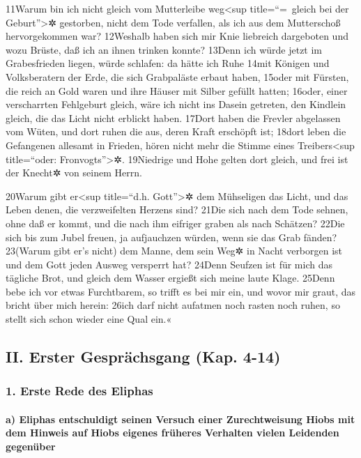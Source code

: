 11Warum bin ich nicht gleich vom Mutterleibe weg\textless sup
title=``=~gleich bei der Geburt''\textgreater✲ gestorben, nicht dem Tode
verfallen, als ich aus dem Mutterschoß hervorgekommen war? 12Weshalb
haben sich mir Knie liebreich dargeboten und wozu Brüste, daß ich an
ihnen trinken konnte? 13Denn ich würde jetzt im Grabesfrieden liegen,
würde schlafen: da hätte ich Ruhe 14mit Königen und Volksberatern der
Erde, die sich Grabpaläste erbaut haben, 15oder mit Fürsten, die reich
an Gold waren und ihre Häuser mit Silber gefüllt hatten; 16oder, einer
verscharrten Fehlgeburt gleich, wäre ich nicht ins Dasein getreten, den
Kindlein gleich, die das Licht nicht erblickt haben. 17Dort haben die
Frevler abgelassen vom Wüten, und dort ruhen die aus, deren Kraft
erschöpft ist; 18dort leben die Gefangenen allesamt in Frieden, hören
nicht mehr die Stimme eines Treibers\textless sup title=``oder:
Fronvogts''\textgreater✲. 19Niedrige und Hohe gelten dort gleich, und
frei ist der Knecht✲ von seinem Herrn.

20Warum gibt er\textless sup title=``d.h. Gott''\textgreater✲ dem
Mühseligen das Licht, und das Leben denen, die verzweifelten Herzens
sind? 21Die sich nach dem Tode sehnen, ohne daß er kommt, und die nach
ihm eifriger graben als nach Schätzen? 22Die sich bis zum Jubel freuen,
ja aufjauchzen würden, wenn sie das Grab fänden? 23(Warum gibt er's
nicht) dem Manne, dem sein Weg✲ in Nacht verborgen ist und dem Gott
jeden Ausweg versperrt hat? 24Denn Seufzen ist für mich das tägliche
Brot, und gleich dem Wasser ergießt sich meine laute Klage. 25Denn bebe
ich vor etwas Furchtbarem, so trifft es bei mir ein, und wovor mir
graut, das bricht über mich herein: 26ich darf nicht aufatmen noch
rasten noch ruhen, so stellt sich schon wieder eine Qual ein.«

\hypertarget{ii.-erster-gespruxe4chsgang-kap.-4-14}{%
\subsection{II. Erster Gesprächsgang (Kap.
4-14)}\label{ii.-erster-gespruxe4chsgang-kap.-4-14}}

\hypertarget{erste-rede-des-eliphas}{%
\subsubsection{1. Erste Rede des Eliphas}\label{erste-rede-des-eliphas}}

\hypertarget{a-eliphas-entschuldigt-seinen-versuch-einer-zurechtweisung-hiobs-mit-dem-hinweis-auf-hiobs-eigenes-fruxfcheres-verhalten-vielen-leidenden-gegenuxfcber}{%
\paragraph{a) Eliphas entschuldigt seinen Versuch einer Zurechtweisung
Hiobs mit dem Hinweis auf Hiobs eigenes früheres Verhalten vielen
Leidenden
gegenüber}\label{a-eliphas-entschuldigt-seinen-versuch-einer-zurechtweisung-hiobs-mit-dem-hinweis-auf-hiobs-eigenes-fruxfcheres-verhalten-vielen-leidenden-gegenuxfcber}}

